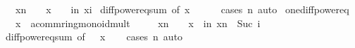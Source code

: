 \begin{isabellebody}
\ \ \ {\isachardoublequoteopen}x{\isacharcircum}{\kern0pt}n\ {\isacharminus}{\kern0pt}\ {}\ {\isacharequal}{\kern0pt}\ {\isacharparenleft}{\kern0pt}x\ {\isacharminus}{\kern0pt}\ {}{\isacharparenright}{\kern0pt}\ {\isacharasterisk}{\kern0pt}\ {\isacharparenleft}{\kern0pt}{\isasymSum}i{\isacharless}{\kern0pt}n{\isachardot}{\kern0pt}\ {\isacharparenleft}{\kern0pt}x{\isacharcircum}{\kern0pt}i{\isacharparenright}{\kern0pt}{\isacharparenright}{\kern0pt}{\isachardoublequoteclose}\isanewline
%
\isadelimproof
%
\endisadelimproof
%
\isatagproof
{}\isamarkupfalse%
\ diff{\isacharunderscore}{\kern0pt}power{\isacharunderscore}{\kern0pt}eq{\isacharunderscore}{\kern0pt}sum\ {\isacharbrackleft}{\kern0pt}of\ x\ {\isacharunderscore}{\kern0pt}\ {}{\isacharbrackright}{\kern0pt}\isanewline
\ \ \isamarkupfalse%
\ {\isacharparenleft}{\kern0pt}cases\ n{\isacharparenright}{\kern0pt}\ auto%
\endisatagproof
{\isafoldproof}%
%
\isadelimproof
\isanewline
%
\endisadelimproof
\isanewline
{}\isamarkupfalse%
\ one{\isacharunderscore}{\kern0pt}diff{\isacharunderscore}{\kern0pt}power{\isacharunderscore}{\kern0pt}eq{\isacharprime}{\kern0pt}{\isacharcolon}{\kern0pt}\isanewline
\ \ \ x\ {\isacharcolon}{\kern0pt}{\isacharcolon}{\kern0pt}\ {\isachardoublequoteopen}{\isacharprime}{\kern0pt}a{\isacharcolon}{\kern0pt}{\isacharcolon}{\kern0pt}{\isacharbraceleft}{\kern0pt}comm{\isacharunderscore}{\kern0pt}ring{\isacharcomma}{\kern0pt}monoid{\isacharunderscore}{\kern0pt}mult{\isacharbraceright}{\kern0pt}{\isachardoublequoteclose}\isanewline
\ \ \ {\isachardoublequoteopen}{}\ {\isacharminus}{\kern0pt}\ x{\isacharcircum}{\kern0pt}n\ {\isacharequal}{\kern0pt}\ {\isacharparenleft}{\kern0pt}{}\ {\isacharminus}{\kern0pt}\ x{\isacharparenright}{\kern0pt}\ {\isacharasterisk}{\kern0pt}\ {\isacharparenleft}{\kern0pt}{\isasymSum}i{\isacharless}{\kern0pt}n{\isachardot}{\kern0pt}\ x{\isacharcircum}{\kern0pt}{\isacharparenleft}{\kern0pt}n\ {\isacharminus}{\kern0pt}\ Suc\ i{\isacharparenright}{\kern0pt}{\isacharparenright}{\kern0pt}{\isachardoublequoteclose}\isanewline
%
\isadelimproof
%
\endisadelimproof
%
\isatagproof
{}\isamarkupfalse%
\ diff{\isacharunderscore}{\kern0pt}power{\isacharunderscore}{\kern0pt}eq{\isacharunderscore}{\kern0pt}sum\ {\isacharbrackleft}{\kern0pt}of\ {}\ {\isacharunderscore}{\kern0pt}\ x{\isacharbrackright}{\kern0pt}\isanewline
\ \ \isamarkupfalse%
\ {\isacharparenleft}{\kern0pt}cases\ n{\isacharparenright}{\kern0pt}\ auto%

\end{isabellebody}

